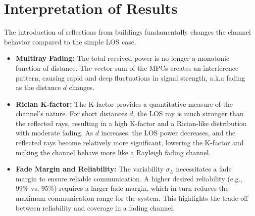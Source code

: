 \section{Interpretation of Results}
The introduction of reflections from buildings fundamentally changes the channel behavior compared to the simple LOS case.
\begin{itemize}
	\item \textbf{Multiray Fading:} The total received power is no longer a monotonic function of distance. The vector sum of the MPCs creates an interference pattern, causing rapid and deep fluctuations in signal strength, a.k.a fading as the distance $d$ changes. 
	\item \textbf{Rician K-factor:} The K-factor provides a quantitative measure of the channel's nature. For short distances $d$, the LOS ray is much stronger than the reflected rays, resulting in a high K-factor and a Rician-like distribution with moderate fading. As $d$ increases, the LOS power decreases, and the reflected rays become relatively more significant, lowering the K-factor and making the channel behave more like a Rayleigh fading channel.
	
	\item \textbf{Fade Margin and Reliability:} The variability $\sigma_L$ necessitates a fade margin to ensure reliable communication. A higher desired reliability (e.g., 99\% vs. 95\%) requires a larger fade margin, which in turn reduces the maximum communication range for the system. This highlights the trade-off between reliability and coverage in a fading channel.
\end{itemize}


